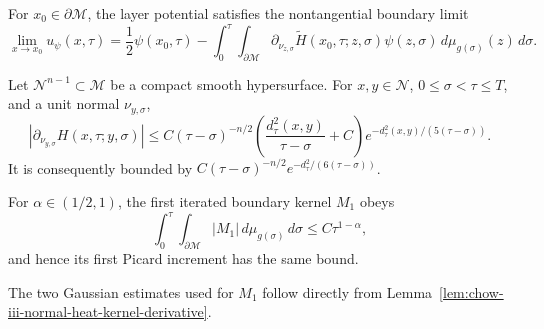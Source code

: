 \begin{lemma}
\label{lem:chow-iii-boundary-jump-relation}


For \(x_0\in\partial\mathcal M\), the layer potential satisfies the
nontangential boundary limit
\[
 \lim_{x\to x_0}u_\psi(x,\tau)
 =\frac12\psi(x_0,\tau)-\int_0^\tau\!\int_{\partial\mathcal M}
 \partial_{\nu_{z,\sigma}}\widetilde H(x_0,\tau;z,\sigma)
 \psi(z,\sigma)\,d\mu_{g(\sigma)}(z)\,d\sigma.
\]
\end{lemma}

\begin{lemma}
\label{lem:chow-iii-normal-heat-kernel-derivative}


Let \(\mathcal N^{n-1}\subset\mathcal M\) be a compact smooth hypersurface.
For \(x,y\in\mathcal N\), \(0\le\sigma<\tau\le T\), and a unit normal
\(\nu_{y,\sigma}\),
\[
 \left|\partial_{\nu_{y,\sigma}}H(x,\tau;y,\sigma)\right|
 \le C(\tau-\sigma)^{-n/2}
 \left(\frac{d_\tau^2(x,y)}{\tau-\sigma}+C\right)
 e^{-d_\tau^2(x,y)/(5(\tau-\sigma))}.
\]
It is consequently bounded by
\(C(\tau-\sigma)^{-n/2}e^{-d_\tau^2/(6(\tau-\sigma))}\).
\end{lemma}

\begin{remark}
\label{rem:chow-iii-first-boundary-kernel-integrable}


For \(\alpha\in(1/2,1)\), the first iterated boundary kernel \(M_1\) obeys
\[
 \int_0^\tau\!\int_{\partial\mathcal M}|M_1|
 \,d\mu_{g(\sigma)}\,d\sigma\le C\tau^{1-\alpha},
\]
and hence its first Picard increment has the same bound.
\end{remark}

\begin{remark}
\label{rem:chow-iii-normal-derivative-gaussian-bounds}


The two Gaussian estimates used for \(M_1\) follow directly from
Lemma~\ref{lem:chow-iii-normal-heat-kernel-derivative}.
\end{remark}

